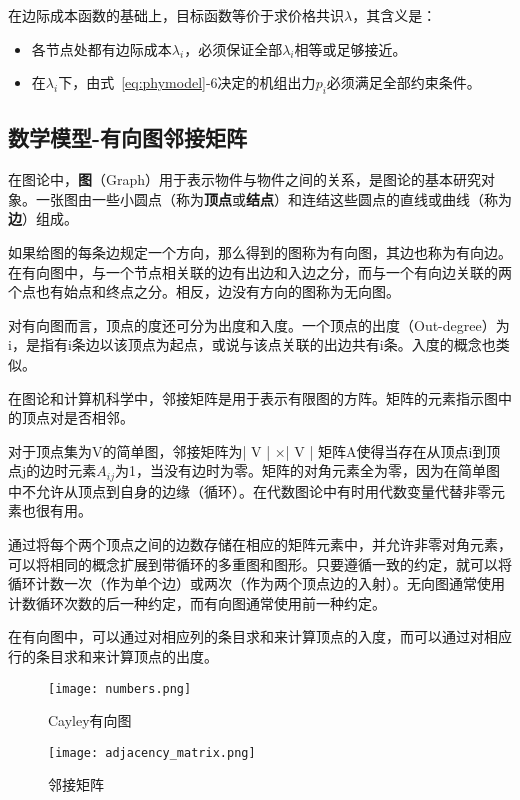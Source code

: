 在边际成本函数的基础上，目标函数等价于求价格共识$\lambda$，其含义是：

\begin{itemize}
    \item 各节点处都有边际成本$\lambda_{i}$，必须保证全部$\lambda_{i}$相等或足够接近。
    \item 在$\lambda_{i}$下，由式~\ref{eq:phymodel}-6决定的机组出力$p_{i}$必须满足全部约束条件。
\end{itemize}

\subsection{数学模型-有向图邻接矩阵}

在图论中，\textbf{图}（Graph）用于表示物件与物件之间的关系，是图论的基本研究对象。一张图由一些小圆点（称为\textbf{顶点}或\textbf{结点}）和连结这些圆点的直线或曲线（称为\textbf{边}）组成。

如果给图的每条边规定一个方向，那么得到的图称为有向图，其边也称为有向边。在有向图中，与一个节点相关联的边有出边和入边之分，而与一个有向边关联的两个点也有始点和终点之分。相反，边没有方向的图称为无向图。

对有向图而言，顶点的度还可分为出度和入度。一个顶点的出度（Out-degree）为i，是指有i条边以该顶点为起点，或说与该点关联的出边共有i条。入度的概念也类似。

在图论和计算机科学中，邻接矩阵是用于表示有限图的方阵。矩阵的元素指示图中的顶点对是否相邻。

对于顶点集为V的简单图，邻接矩阵为| V | ×| V | 矩阵A使得当存在从顶点i到顶点j的边时元素$A_{ij}$为1，当没有边时为零。矩阵的对角元素全为零，因为在简单图中不允许从顶点到自身的边缘（循环）。在代数图论中有时用代数变量代替非零元素也很有用。

通过将每个两个顶点之间的边数存储在相应的矩阵元素中，并允许非零对角元素，可以将相同的概念扩展到带循环的多重图和图形。只要遵循一致的约定，就可以将循环计数一次（作为单个边）或两次（作为两个顶点边的入射）。无向图通常使用计数循环次数的后一种约定，而有向图通常使用前一种约定。

在有向图中，可以通过对相应列的条目求和来计算顶点的入度，而可以通过对相应行的条目求和来计算顶点的出度。

\begin{figure}[htbp]
    \begin{minipage}{0.48\textwidth}
      \centering
      \texttt{[image: numbers.png]}
      \caption{Cayley有向图}
      \label{fig:Directed-Cayley-graph}
    \end{minipage}\hfill
    \begin{minipage}{0.48\textwidth}
      \centering
      \texttt{[image: adjacency\_matrix.png]}
      \caption{邻接矩阵}
      \label{fig:Adjacency-matrix}
    \end{minipage}
\end{figure}

